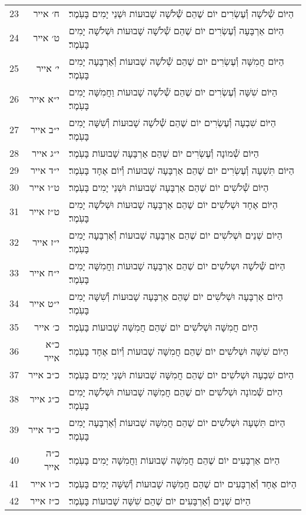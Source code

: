\documentclass[twoside, openany, parskip=half, 11pt]{book}
\begin{document}
\begin{scriptsize}
\begin{longtable}{ l | r | p{} }
23 & ח׳ אייר & הַיּוֹם שְׁ֯לֹשָׁה וְ֯עֶשְׂרִים יוֹם שֶׁהֵם שְׁ֯לֹשָׁה שָׁבוּעוֹת וּשְׁנֵי יָמִים בָּעֹֽמֶר׃ \\
24 & ט׳ אייר & הַיּוֹם אַרְבָּעָה וְ֯עֶשְׂרִים יוֹם שֶׁהֵם שְׁ֯לֹשָׁה שָׁבוּעוֹת וּשְׁלֹשָׁה יָמִים בָּעֹֽמֶר׃ \\
25 & י׳ אייר & הַיּוֹם חֲמִשָּׁה וְ֯עֶשְׂרִים יוֹם שֶׁהֵם שְׁ֯לֹשָׁה שָׁבוּעוֹת וְ֯אַרְבָּעָה יָמִים בָּעֹֽמֶר׃ \\
26 & י״א אייר & הַיּוֹם שִׁשָּׁה וְ֯עֶשְׂרִים יוֹם שֶׁהֵם שְׁ֯לֹשָׁה שָׁבוּעוֹת וַחֲמִשָּׁה יָמִים בָּעֹֽמֶר׃ \\
27 & י״ב אייר & הַיּוֹם שִׁבְעָה וְ֯עֶשְׂרִים יוֹם שֶׁהֵם שְׁ֯לֹשָׁה שָׁבוּעוֹת וְ֯שִׁשָּׁה יָמִים בָּעֹֽמֶר׃ \\
28 & י״ג אייר & הַיּוֹם שְׁ֯מוֹנָה וְ֯עֶשְׂרִים יוֹם שֶׁהֵם אַרְבָּעָה שָׁבוּעוֹת בָּעֹֽמֶר׃ \\
29 & י״ד אייר & הַיּוֹם תִּשְׁעָה וְ֯עֶשְׂרִים יוֹם שֶׁהֵם אַרְבָּעָה שָׁבוּעוֹת וְ֯יוֹם אֶחָד בָּעֹֽמֶר׃ \\
30 & ט״ו אייר & הַיּוֹם שְׁ֯לֹשִׁים יוֹם שֶׁהֵם אַרְבָּעָה שָׁבוּעוֹת וּשְׁנֵי יָמִים בָּעֹֽמֶר׃ \\
31 & ט״ז אייר & הַיּוֹם אֶחָד וּשְׁלֹשִׁים יוֹם שֶׁהֵם אַרְבָּעָה שָׁבוּעוֹת וּשְׁלֹשָׁה יָמִים בָּעֹֽמֶר׃ \\
32 & י״ז אייר & הַיּוֹם שְׁנֵים וּשְׁלֹשִׁים יוֹם שֶׁהֵם אַרְבָּעָה שָׁבוּעוֹת וְ֯אַרְבָּעָה יָמִים בָּעֹֽמֶר׃ \\
33 & י״ח אייר & הַיּוֹם שְׁ֯לֹשָׁה וּשְלֹשִׁים יוֹם שֶׁהֵם אַרְבָּעָה שָׁבוּעוֹת וַחֲמִשָּׁה יָמִים בָּעֹֽמֶר׃ \\
34 & י״ט אייר & הַיּוֹם אַרְבָּעָה וּשְׁלֹשִׁים יוֹם שֶׁהֵם אַרְבָּעָה שָׁבוּעוֹת וְ֯שִׁשָּׁה יָמִים בָּעֹֽמֶר׃ \\
35 & כ׳ אייר & הַיּוֹם חֲמִשָּׁה וּשְׁלֹשִׁים יוֹם שֶׁהֵם חֲמִשָּׁה שָׁבוּעוֹת בָּעֹֽמֶר׃ \\
36 & כ״א אייר & הַיּוֹם שִׁשָּׁה וּשְׁלֹשִׁים יוֹם שֶׁהֵם חֲמִשָּׁה שָׁבוּעוֹת וְ֯יוֹם אֶחָד בָּעֹֽמֶר׃ \\
37 & כ״ב אייר & הַיּוֹם שִׁבְעָה וּשְׁלֹשִׁים יוֹם שֶׁהֵם חֲמִשָּׁה שָׁבוּעוֹת וּשְׁנֵי יָמִים בָּעֹֽמֶר׃ \\
38 & כ״ג אייר & הַיּוֹם שְׁ֯מוֹנָה וּשְׁלֹשִׁים יוֹם שֶׁהֵם חֲמִשָּׁה שָׁבוּעוֹת וּשְׁלֹשָׁה יָמִים בָּעֹֽמֶר׃ \\
39 & כ״ד אייר & הַיּוֹם תִּשְׁעָה וּשְׁלֹשִׁים יוֹם שֶׁהֵם חֲמִשָּׁה שָׁבוּעוֹת וְ֯אַרְבָּעָה יָמִים בָּעֹֽמֶר׃ \\
40 & כ״ה אייר & הַיּוֹם אַרְבָּעִים יוֹם שֶׁהֵם חֲמִשָּׁה שָׁבוּעוֹת וַחֲמִשָּׁה יָמִים בָּעֹֽמֶר׃ \\
41 & כ״ו אייר & הַיּוֹם אֶחָד וְ֯אַרְבָּעִים יוֹם שֶׁהֵם חֲמִשָּׁה שָׁבוּעוֹת וְ֯שִׁשָּׁה יָמִים בָּעֹֽמֶר׃ \\
42 & כ״ז אייר & הַיּוֹם שְׁנֵים וְ֯אַרְבָּעִים יוֹם שֶׁהֵם שִׁשָּׁה שָׁבוּעוֹת בָּעֹֽמֶר׃ \\

\end{longtable}
\end{scriptsize}
\end{document}
